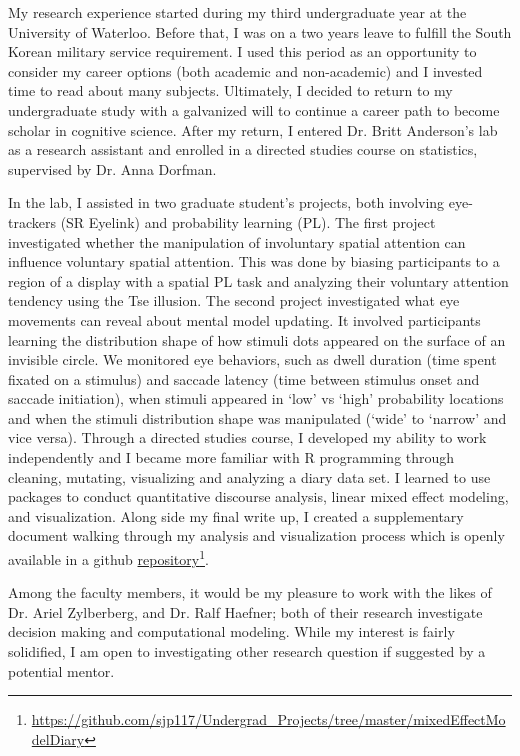 \documentclass[12pt]{article}
\begin{document}
	My research experience started during my third undergraduate year at the University of Waterloo. Before that, I was on a two years leave to fulfill the South Korean military service requirement. I used this period as an opportunity to consider my career options (both academic and non-academic) and I invested time to read about many subjects. Ultimately, I decided to return to my undergraduate study with a galvanized will to continue a career path to become scholar in cognitive science. After my return, I entered Dr. Britt Anderson's lab as a research assistant and enrolled in a directed studies course on statistics, supervised by Dr. Anna Dorfman.

	In the lab, I assisted in two graduate student's projects, both involving eye-trackers (SR Eyelink) and probability learning (PL). The first project investigated whether the manipulation of involuntary spatial attention can influence voluntary spatial attention. This was done by biasing participants to a region of a display with a spatial PL task and analyzing their voluntary attention tendency using the Tse illusion. The second project investigated what eye movements can reveal about mental model updating. It involved participants learning the distribution shape of how stimuli dots appeared on the surface of an invisible circle. We monitored eye behaviors, such as dwell duration (time spent fixated on a stimulus) and saccade latency (time between stimulus onset and saccade initiation), when stimuli appeared in `low' vs `high' probability locations and when the stimuli distribution shape was manipulated (`wide' to `narrow' and vice versa). Through a directed studies course, I developed my ability to work independently and I became more familiar with R programming through cleaning, mutating, visualizing and analyzing a diary data set. I learned to use packages to conduct quantitative discourse analysis, linear mixed effect modeling, and visualization. Along side my final write up, I created a supplementary document walking through my analysis and visualization process which is openly available in a github \href{https://github.com/sjp117/Undergrad_Projects/tree/master/mixedEffectModelDiary}{repository}\footnote{\url{https://github.com/sjp117/Undergrad\_Projects/tree/master/mixedEffectModelDiary}}.

	Among the faculty members, it would be my pleasure to work with the likes of Dr. Ariel Zylberberg, and Dr. Ralf Haefner; both of their research investigate decision making and computational modeling. While my interest is fairly solidified, I am open to investigating other research question if suggested by a potential mentor.
	
\end{document}
